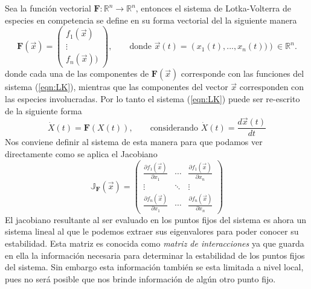 \newpage
\begin{definición}
	Sea la función vectorial $\mathbf{F}:\mathbb{R}^n\to\mathbb{R}^n$, entonces el sistema de Lotka-Volterra de especies en competencia se define en su forma vectorial del la siguiente manera
	\begin{equation}\label{eqn:Fmatricial}
		\mathbf{F}(\vec{x})=\begin{pmatrix}
			f_1(\vec{x})\\
			\vdots\\
			f_n(\vec{x}))
		\end{pmatrix},\qquad\text{donde $\vec{x}(t)=\left(x_1(t),...,x_n(t))\right)\in\mathbb{R}^n$.}
	\end{equation}
	donde cada una de las componentes de $\mathbf{F}(\vec{x})$ corresponde con las funciones del sistema (\ref{eqn:LK}), mientras que las componentes del vector $\vec{x}$ corresponden con las especies involucradas. Por lo tanto el sistema (\ref{eqn:LK}) puede ser re-escrito de la siguiente forma
	\begin{equation}\label{eqn:LKmatricial}
		\dot{X}(t) = \mathbf{F}(X(t)),\qquad\text{considerando $\dot{X}(t)=\frac{d\vec{x}(t)}{dt}$}
	\end{equation}
	Nos conviene definir al sistema de esta manera para que podamos ver directamente como se aplica el Jacobiano 
	\begin{equation}\label{eqn:Jacobiano}
		\mathbb{J}_\mathbf{F}(\vec{x}) = \begin{pmatrix}
			\frac{\partial f_1(\vec{x})}{\partial x_1} & \cdots &\frac{\partial f_1(\vec{x})}{\partial x_n}\\
			\vdots & \ddots & \vdots\\
			\frac{\partial f_n(\vec{x})}{\partial x_1} & \cdots &\frac{\partial f_n(\vec{x})}{\partial x_n}
		\end{pmatrix}
	\end{equation}
	El jacobiano resultante al ser evaluado en los puntos fijos del sistema es ahora un sistema lineal al que le podemos extraer sus eigenvalores para poder conocer su estabilidad. Esta matriz es conocida como \textit{matriz de interacciones} ya que guarda en ella la información necesaria para determinar la estabilidad de los puntos fijos del sistema. Sin embargo esta información también se esta limitada a nivel local, pues no será posible que nos brinde información de algún  otro punto fijo.
\end{definición}

